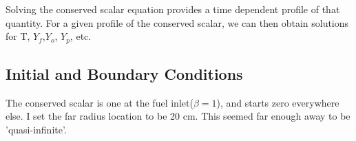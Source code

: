 \documentclass{article}
\begin{document}
Solving the conserved scalar equation provides a time dependent profile
of that quantity. For a given profile of the conserved scalar, we can
then obtain solutions for T, $Y_f$,$Y_o$, $Y_p$, etc. 

\subsection*{Initial and Boundary Conditions}
 
The conserved scalar is one at the fuel inlet($\beta = 1$), and starts
zero everywhere else. I set the far radius location to be 20 cm. This seemed far enough away to be 'quasi-infinite'.
\end{document}
